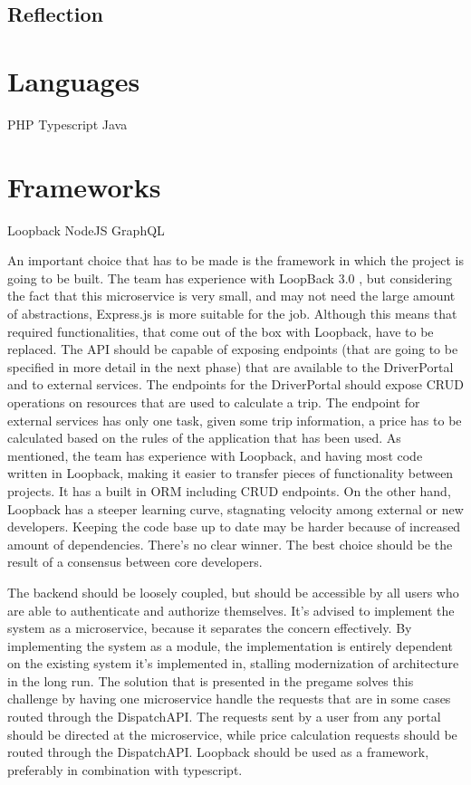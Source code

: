 \subsection{Reflection}

%
\section{Languages}
PHP
Typescript
Java

%
\section{Frameworks}
Loopback
NodeJS
GraphQL

An important choice that has to be made is the framework in which the project is going to be built. The team has experience with LoopBack 3.0 \cite{lb}, but considering the fact that this microservice is very small, and may not need the large amount of abstractions, Express.js is more suitable for the job. Although this means that required functionalities, that come out of the box with Loopback, have to be replaced. The API should be capable of exposing endpoints (that are going to be specified in more detail in the next phase) that are available to the DriverPortal and to external services. The endpoints for the DriverPortal should expose CRUD operations on resources that are used to calculate a trip. The endpoint for external services has only one task, given some trip information, a price has to be calculated based on the rules of the application that has been used. As mentioned, the team has experience with Loopback, and having most code written in Loopback, making it easier to transfer pieces of functionality between projects. It has a built in ORM including CRUD endpoints. On the other hand, Loopback has a steeper learning curve, stagnating velocity among external or new developers. Keeping the code base up to date may be harder because of increased amount of dependencies. There’s no clear winner. The best choice should be the result of a consensus between core developers.

The backend should be loosely coupled, but should be accessible by all users who are able to authenticate and authorize themselves. It’s advised to implement the system as a microservice, because it separates the concern effectively. By implementing the system as a module, the implementation is entirely dependent on the existing system it’s implemented in, stalling modernization of architecture in the long run. The solution that is presented in the pregame solves this challenge by having one microservice handle the requests that are in some cases routed through the DispatchAPI. The requests sent by a user from any portal should be directed at the microservice, while price calculation requests should be routed through the DispatchAPI. Loopback should be used as a framework, preferably in combination with typescript.

